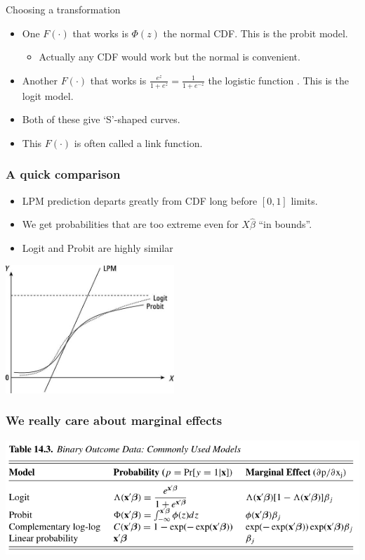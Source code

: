 \begin{frame}{Choosing a transformation}
       \begin{itemize}
       \item One $F(\cdot)$ that works is $\Phi(z)$ the normal CDF. This is the \alert{probit} model.
       \begin{itemize}
       \item Actually any CDF would work but the normal is convenient.
       \end{itemize}
       \item Another $F(\cdot)$ that works is $\frac{e^z}{1+ e^z}=\frac{1}{1+e^{-z}}$ the logistic function . This is the \alert{logit} model.
       \item Both of these give `S'-shaped curves.
       \item This $F(\cdot)$ is often called a \alert{link function}. 
       \end{itemize}
\end{frame}


\begin{frame}
       \frametitle{A quick comparison}
       \begin{itemize}
       \item LPM prediction departs greatly from CDF long before $[0,1]$ limits.
       \item We get probabilities that are too extreme even for $X\hat{\beta}$ ``in bounds''.
       \item Logit and Probit are highly similar
       \end{itemize}
       \begin{center}
       \includegraphics[width=2.5in]{resources/lpm-probit.jpg}
       \end{center}
\end{frame}

\begin{frame}
       \frametitle{We really care about marginal effects}
       \begin{center}
       \includegraphics[width=\textwidth]{resources/CTmarginals}
       \end{center}
\end{frame}

